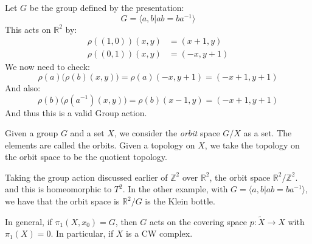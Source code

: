 \documentclass{book}                                                           %
\begin{document}
            \begin{example}
                Let $G$ be the group defined by the presentation:
                \begin{equation}
                    G=\langle{a,b|ab=ba^{\minus{1}}}\rangle
                \end{equation}
                This acts on $\mathbb{R}^{2}$ by:
                \begin{subequations}
                    \begin{align}
                        \rho((1,0))(x,y)&=(x+1,y)\\
                        \rho((0,1))(x,y)&=(\minus{x},y+1)
                    \end{align}
                \end{subequations}
                We now need to check:
                \begin{equation}
                    \rho(a)\big(\rho(b)(x,y)\big)=
                    \rho(a)(\minus{x},y+1)=
                    (\minus{x}+1,y+1)
                \end{equation}
                And also:
                \begin{equation}
                    \rho(b)\big(\rho(a^{\minus{1}})(x,y)\big)=
                    \rho(b)(x-1,y)=(\minus{x}+1,y+1)
                \end{equation}
                And thus this is a valid Group action.
            \end{example}
            Given a group $G$ and a set $X$, we consider the
            \textit{orbit} space $G/X$ as a set. The elements are
            called the orbits. Given a topology on $X$, we take
            the topology on the orbit space to be the quotient
            topology.
            \begin{example}
                Taking the group action discussed earlier of
                $\mathbb{Z}^{2}$ over $\mathbb{R}^{2}$, the orbit
                space $\mathbb{R}^{2}/\mathbb{Z}^{2}$. and this is
                homeomorphic to $T^{2}$. In the other example, with
                $G=\langle{a,b|ab=ba^{\minus{1}}}\rangle$,
                we have that the orbit space is
                $\mathbb{R}^{2}/G$ is the Klein bottle.
            \end{example}
            In general, if $\pi_{1}(X,x_{0})=G$, then $G$ acts on
            the covering space
            $p:\tilde{X}\rightarrow{X}$ with $\pi_{1}(X)=0$. In
            particular, if $X$ is a CW complex.
\end{document}
